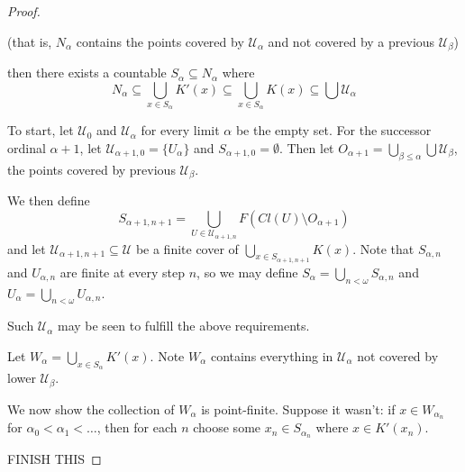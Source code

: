 \documentclass[11pt]{article}
\theoremstyle{plain}
\theoremstyle{definition}
\theoremstyle{remark}
\newcommand{\<}{\langle}
\renewcommand{\>}{\rangle}
\begin{document}
{\begin{proof}
\begin{itemize}
(that is, $N_\alpha$ contains the points covered by $\mathcal{U}_\alpha$ and not covered by a previous $\mathcal{U}_\beta$)

then there exists a countable $S_\alpha\subseteq N_\alpha$ where \[ N_\alpha \subseteq \bigcup_{x\in S_\alpha} K'(x) \subseteq \bigcup_{x\in S_\alpha} K(x) \subseteq \bigcup \mathcal{U}_\alpha\]
\end{itemize}

To start, let $\mathcal{U}_0$ and $\mathcal{U}_\alpha$ for every limit $\alpha$ be the empty set. For the successor ordinal $\alpha+1$, let $\mathcal{U}_{\alpha+1,0}=\{U_\alpha\}$ and $S_{\alpha+1,0}=\emptyset$. Then let $O_{\alpha+1}=\bigcup_{\beta\leq\alpha}\bigcup\mathcal{U}_\beta$, the points covered by previous $\mathcal{U}_\beta$.

We then define \[S_{\alpha+1,n+1}=\bigcup_{U\in\mathcal{U}_{\alpha+1,n}} F(Cl(U)\setminus O_{\alpha+1})\] and let $\mathcal{U}_{\alpha+1,n+1}\subseteq \mathcal{U}$ be a finite cover of $\bigcup_{x \in S_{\alpha+1,n+1}} K(x)$. Note that $S_{\alpha,n}$ and $U_{\alpha,n}$ are finite at every step $n$, so we may define $S_\alpha = \bigcup_{n<\omega} S_{\alpha,n}$ and $U_\alpha=\bigcup_{n<\omega} U_{\alpha,n}$.

Such $\mathcal{U}_\alpha$ may be seen to fulfill the above requirements.

Let $W_\alpha = \bigcup_{x\in S_\alpha} K'(x)$. Note $W_\alpha$ contains everything in $\mathcal{U}_\alpha$ not covered by lower $\mathcal{U}_\beta$.

We now show the collection of $W_\alpha$ is point-finite. Suppose it wasn't: if $x \in W_{\alpha_n}$ for $\alpha_0<\alpha_1<\dots$, then for each $n$ choose some $x_n \in S_{\alpha_n}$ where $x \in K'(x_n)$.

FINISH THIS

\end{proof}

}
\end{document}
